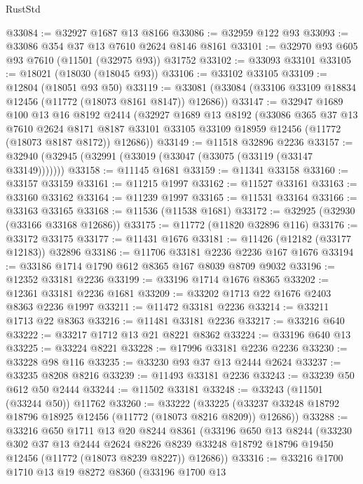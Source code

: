 \begin{lexlean}{RustStd}
\begin{coremodule}
@33084 := @32927 @1687 @13 @8166
@33086 := @32959 @122 @93
@33093 := @33086 @354 @37 @13 @7610 @2624 @8146 @8161
@33101 := @32970 @93 @605 @93 @7610 (@11501 (@32975 @93)) @31752
@33102 := @33093 @33101
@33105 := @18021 (@18030 (@18045 @93))
@33106 := @33102 @33105
@33109 := @12804 (@18051 @93 @50)
@33119 := @33081 (@33084 (@33106 @33109 @18834 @12456 (@11772 (@18073 @8161 @8147)) @12686))
@33147 := @32947
    @1689
    @100
    @13
    @16
    @8192
    @2414
    (@32927
      @1689
      @13
      @8192
      (@33086
        @365
        @37
        @13
        @7610
        @2624
        @8171
        @8187
        @33101
        @33105
        @33109
        @18959
        @12456
        (@11772 (@18073 @8187 @8172))
        @12686))
@33149 := @11518 @32896 @2236
@33157 := @32940 (@32945 (@32991 (@33019 (@33047 (@33075 (@33119 (@33147 @33149)))))))
@33158 := @11145 @1681
@33159 := @11341 @33158
@33160 := @33157 @33159
@33161 := @11215 @1997
@33162 := @11527 @33161
@33163 := @33160 @33162
@33164 := @11239 @1997
@33165 := @11531 @33164
@33166 := @33163 @33165
@33168 := @11536 (@11538 @1681)
@33172 := @32925 (@32930 (@33166 @33168 @12686))
@33175 := @11772 (@11820 @32896 @116)
@33176 := @33172 @33175
@33177 := @11431 @1676
@33181 := @11426 (@12182 (@33177 @12183)) @32896
@33186 := @11706 @33181 @2236 @2236 @167 @1676
@33194 := @33186 @1714 @1790 @612 @8365 @167 @8039 @8709 @9032
@33196 := @12352 @33181 @2236
@33199 := @33196 @1714 @1676 @8365
@33202 := @12361 @33181 @2236 @1681
@33209 := @33202 @1713 @22 @1676 @2403 @8363 @2236 @1997
@33211 := @11472 @33181 @2236
@33214 := @33211 @1713 @22 @8363
@33216 := @11481 @33181 @2236
@33217 := @33216 @640
@33222 := @33217 @1712 @13 @21 @8221 @8362
@33224 := @33196 @640 @13
@33225 := @33224 @8221
@33228 := @17996 @33181 @2236 @2236
@33230 := @33228 @98 @116
@33235 := @33230 @93 @37 @13 @2444 @2624
@33237 := @33235 @8208 @8216
@33239 := @11493 @33181 @2236
@33243 := @33239 @50 @612 @50 @2444
@33244 := @11502 @33181
@33248 := @33243 (@11501 (@33244 @50)) @11762
@33260 := @33222
    (@33225 (@33237 @33248 @18792 @18796 @18925 @12456 (@11772 (@18073 @8216 @8209)) @12686))
@33288 := @33216
    @650
    @1711
    @13
    @20
    @8244
    @8361
    (@33196
      @650
      @13
      @8244
      (@33230
        @302
        @37
        @13
        @2444
        @2624
        @8226
        @8239
        @33248
        @18792
        @18796
        @19450
        @12456
        (@11772 (@18073 @8239 @8227))
        @12686))
@33316 := @33216
    @1700
    @1710
    @13
    @19
    @8272
    @8360
    (@33196
      @1700
      @13

\end{coremodule}
\end{lexlean}
